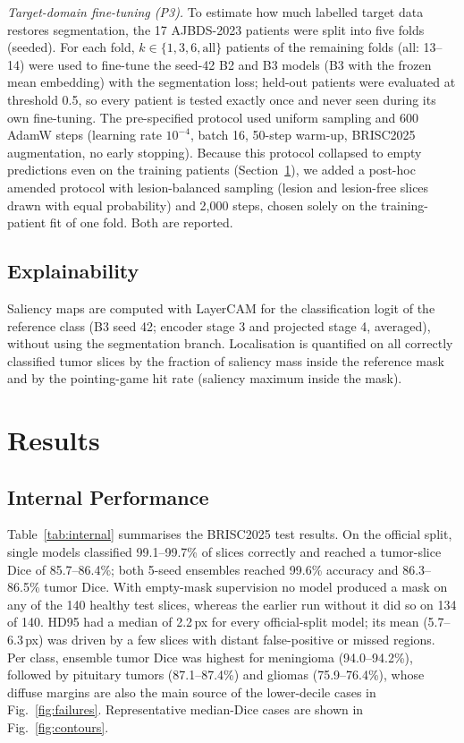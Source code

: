 \documentclass[journal]{IEEEtran}
\begin{document}
\textit{Target-domain fine-tuning (P3).} To estimate how much labelled target data restores segmentation, the 17 AJBDS-2023 patients were split into five folds (seeded). For each fold, $k\in\{1,3,6,\text{all}\}$ patients of the remaining folds (all: 13--14) were used to fine-tune the seed-42 B2 and B3 models (B3 with the frozen mean embedding) with the segmentation loss; held-out patients were evaluated at threshold 0.5, so every patient is tested exactly once and never seen during its own fine-tuning. The pre-specified protocol used uniform sampling and 600 AdamW steps (learning rate $10^{-4}$, batch 16, 50-step warm-up, BRISC2025 augmentation, no early stopping). Because this protocol collapsed to empty predictions even on the training patients (Section~\ref{sec:results}), we added a post-hoc amended protocol with lesion-balanced sampling (lesion and lesion-free slices drawn with equal probability) and 2{,}000 steps, chosen solely on the training-patient fit of one fold. Both are reported.

\subsection{Explainability}
Saliency maps are computed with LayerCAM \cite{jiang2021layercam} for the classification logit of the reference class (B3 seed 42; encoder stage 3 and projected stage 4, averaged), without using the segmentation branch. Localisation is quantified on all correctly classified tumor slices by the fraction of saliency mass inside the reference mask and by the pointing-game hit rate (saliency maximum inside the mask).

\section{Results}
\label{sec:results}
\subsection{Internal Performance}
Table~\ref{tab:internal} summarises the BRISC2025 test results. On the official split, single models classified 99.1--99.7\% of slices correctly and reached a tumor-slice Dice of 85.7--86.4\%; both 5-seed ensembles reached 99.6\% accuracy and 86.3--86.5\% tumor Dice. With empty-mask supervision no model produced a mask on any of the 140 healthy test slices, whereas the earlier run without it did so on 134 of 140. HD95 had a median of 2.2\,px for every official-split model; its mean (5.7--6.3\,px) was driven by a few slices with distant false-positive or missed regions. Per class, ensemble tumor Dice was highest for meningioma (94.0--94.2\%), followed by pituitary tumors (87.1--87.4\%) and gliomas (75.9--76.4\%), whose diffuse margins are also the main source of the lower-decile cases in Fig.~\ref{fig:failures}. Representative median-Dice cases are shown in Fig.~\ref{fig:contours}.
\end{document}
